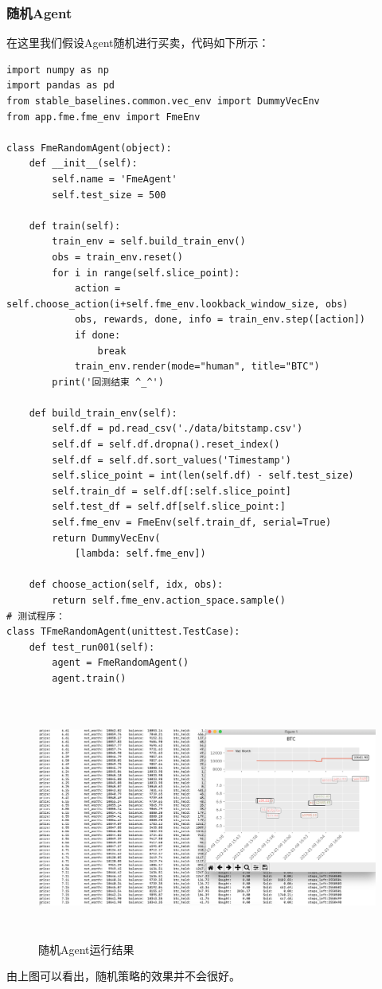 \documentclass{article}
\begin{document}
\subsubsection{随机Agent}
在这里我们假设Agent随机进行买卖，代码如下所示：
\begin{lstlisting}
import numpy as np
import pandas as pd
from stable_baselines.common.vec_env import DummyVecEnv
from app.fme.fme_env import FmeEnv

class FmeRandomAgent(object):
    def __init__(self):
        self.name = 'FmeAgent'
        self.test_size = 500

    def train(self):
        train_env = self.build_train_env()
        obs = train_env.reset()
        for i in range(self.slice_point):
            action = self.choose_action(i+self.fme_env.lookback_window_size, obs)
            obs, rewards, done, info = train_env.step([action])
            if done:
                break
            train_env.render(mode="human", title="BTC")
        print('回测结束 ^_^')

    def build_train_env(self):
        self.df = pd.read_csv('./data/bitstamp.csv')
        self.df = self.df.dropna().reset_index()
        self.df = self.df.sort_values('Timestamp')
        self.slice_point = int(len(self.df) - self.test_size)
        self.train_df = self.df[:self.slice_point]
        self.test_df = self.df[self.slice_point:]
        self.fme_env = FmeEnv(self.train_df, serial=True)
        return DummyVecEnv(
            [lambda: self.fme_env])

    def choose_action(self, idx, obs):
        return self.fme_env.action_space.sample()
# 测试程序：
class TFmeRandomAgent(unittest.TestCase):
    def test_run001(self):
        agent = FmeRandomAgent()
        agent.train()
\end{lstlisting}
\begin{figure}[H]
    \caption{随机Agent运行结果}
    \label{f000091}
    \centering
    \includegraphics[height=8cm]{images/f000091}
\end{figure}
由上图可以看出，随机策略的效果并不会很好。
\end{document}
